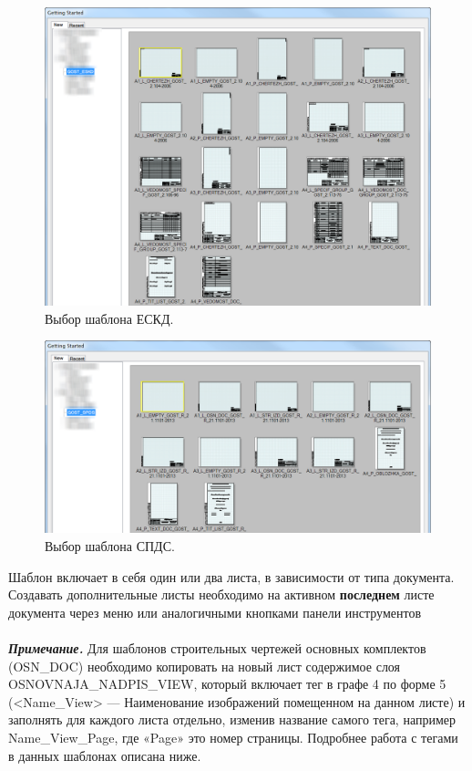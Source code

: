 \documentclass[14pt]{extreport}
\begin{document}
\begin{figure}[t]
	\centering
	\includegraphics[width=\textwidth]{ESKD_NEW_FILE}
    \caption{Выбор шаблона ЕСКД.\label{ESKD_NEW_FILE}}
\end{figure}

\begin{figure}[t]
	\centering
	\includegraphics[width=\textwidth]{SPDS_NEW_FILE}
    \caption{Выбор шаблона СПДС.\label{SPDS_NEW_FILE}}
\end{figure}
\clearpage

Шаблон включает в себя один или два листа, в зависимости от типа документа. Создавать дополнительные листы необходимо на активном \textbf{последнем} листе документа через меню или аналогичными кнопками панели инструментов\\

\noindent
{} \\

\textbf{\emph{Примечание.}} Для шаблонов строительных чертежей основных комплектов (\textsf{OSN\_DOC}) необходимо копировать на новый лист содержимое слоя \textsf{OSNOVNAJA\_NADPIS\_VIEW}, который включает тег в графе 4 по форме 5 (\textsf{<Name\_View>} --- Наименование изображений помещенном на данном листе) и заполнять для каждого листа отдельно, изменив название самого тега, например \textsf{Name\_View\_Page}, где «\textsf{Page}» это номер страницы. Подробнее работа с тегами в данных шаблонах описана ниже.\\
\end{document}
